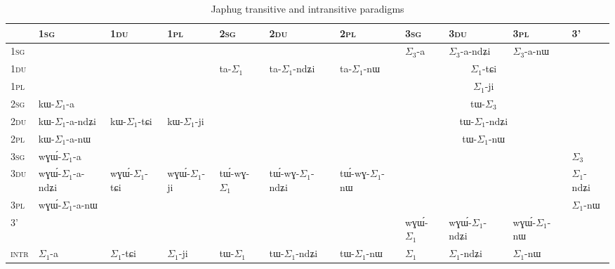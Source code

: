 \documentclass[oldfontcommands,oneside,a4paper,11pt]{article}
\newcommand{\ipa}[1]{{\phon \mbox{#1}}} %
\newcommand{\grise}[1]{\cellcolor{lightgray}\textbf{#1}}
\newcommand{\ra}{$\Sigma_1$}
\newcommand{\rc}{$\Sigma_3$}
\begin{document}
\begin{landscape}
\begin{table}[H]
\caption{Japhug transitive and intransitive paradigms}\label{tab:japhug.tr}
\begin{tabular}{l|l|l|l|l|l|l|l|l|l|l|}
\textsc{} & 	\textsc{1sg} & 	  \textsc{1du} & 	\textsc{1pl} & 	\textsc{2sg} & 	\textsc{2du} & 	\textsc{2pl} & 	\textsc{3sg} & 	\textsc{3du} & 	\textsc{3pl} & 	\textsc{3'} \\ 	
\hline
\textsc{1sg} & \multicolumn{3}{c|}{\grise{}} &	\ipa{} & 	\ipa{} & 	\ipa{} & 	\ipa{\rc{}-a}   & 	 \ipa{\rc{}-a-ndʑi} & 	 \ipa{\rc{}-a-nɯ} & 	\grise{} \\	
\cline{8-10}
\textsc{1du} & 	\multicolumn{3}{c|}{\grise{}} &	\ipa{ta-\ra{}} & 	\ipa{ta-\ra{}-ndʑi} & 	\ipa{ta-\ra{}-nɯ} & 	\multicolumn{3}{c|}{ \ipa{\ra{}-tɕi}}  & 	\grise{} \\	
\cline{8-10}
\textsc{1pl} & 	\multicolumn{3}{c|}{\grise{}} & 	  & 	&  & 	\multicolumn{3}{c|}{ \ipa{\ra{}-ji}}  & 	\grise{} \\	
\cline{1-10}
\textsc{2sg} & 	\ipa{kɯ-\ra{}-a} & 	\ipa{} & 	\ipa{} & 	\multicolumn{3}{c|}{\grise{}}&	\multicolumn{3}{c|}{\ipa{tɯ-\rc{}}} & 	\grise{} \\	
\cline{2-2}
\cline{8-10}
\textsc{2du} & 	\ipa{kɯ-\ra{}-a-ndʑi} & 	\ipa{kɯ-\ra{}-tɕi} & 	\ipa{kɯ-\ra{}-ji} & 	\multicolumn{3}{c|}{\grise{}} &	\multicolumn{3}{c|}{\ipa{tɯ-\ra{}-ndʑi}} & 	\grise{} \\	
\cline{2-2}
\cline{8-10}
\textsc{2pl} & 	\ipa{kɯ-\ra{}-a-nɯ} & 	\ipa{} & 	\ipa{} & 	\multicolumn{3}{c|}{\grise{}}&	\multicolumn{3}{c|}{\ipa{tɯ-\ra{}-nɯ}} & 	\grise{} \\	
\hline
\textsc{3sg} &  	\ipa{wɣɯ́-\ra{}-a} & 	\ipa{} & 	\ipa{} & 	\ipa{} & 	\ipa{} & 	\ipa{} & \multicolumn{3}{c|}{\grise{}} &	\ipa{\rc{}} \\ 	
\cline{2-2}
\cline{11-11}
\textsc{3du} &  	\ipa{wɣɯ́-\ra{}-a-ndʑi} & 	 \ipa{wɣɯ́-\ra{}-tɕi} & 		\ipa{wɣɯ́-\ra{}-ji} & 	\ipa{tɯ́-wɣ-\ra{}} & 	\ipa{tɯ́-wɣ-\ra{}-ndʑi} & 	\ipa{tɯ́-wɣ-\ra{}-nɯ} & 	\multicolumn{3}{c|}{\grise{}} &	\ipa{\ra{}-ndʑi} \\ 
\cline{2-2}	
\cline{11-11}
\textsc{3pl} &  	\ipa{wɣɯ́-\ra{}-a-nɯ} & 	\ipa{} & 	\ipa{} & 	\ipa{} & 	\ipa{} & 	\ipa{} & \multicolumn{3}{c|}{\grise{}} &	\ipa{\ra{}-nɯ} \\ 	
\hline
\textsc{3'} & 	\multicolumn{6}{c|}{\grise{}} &	\ipa{wɣɯ́-\ra{}} & 	\ipa{wɣɯ́-\ra{}-ndʑi} & 	\ipa{wɣɯ́-\ra{}-nɯ} & 	\grise{} \\	
	\hline	\hline
\textsc{intr}&\ipa{\ra{}-a}&\ipa{\ra{}-tɕi}&\ipa{\ra{}-ji}&\ipa{tɯ-\ra{}}&\ipa{tɯ-\ra{}-ndʑi}&\ipa{tɯ-\ra{}-nɯ}&\ipa{\ra{}}&\ipa{\ra{}-ndʑi} &\ipa{\ra{}-nɯ}& 	\grise{} \\	
	\hline
\end{tabular}
\end{table}
\end{landscape}
\end{document}
